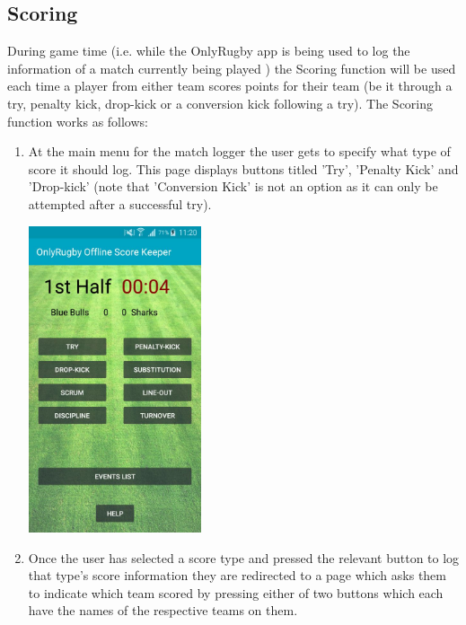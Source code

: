 \documentclass[hidelinks,a4paper,12pt]{article}
\begin{document}
\newpage

	\subsection{Scoring}
		During game time (i.e. while the OnlyRugby app is being used to log the information of a match currently being played ) the Scoring function will be used each time a player from either team scores points for their team (be it through a try, penalty kick, drop-kick or a conversion kick following a try). The Scoring function works as follows:
		\begin{enumerate}
			\item At the main menu for the match logger the user gets to specify what type of score it should log. This page displays buttons titled 'Try', 'Penalty Kick' and  'Drop-kick' (note that 'Conversion Kick' is not an option as it can only be attempted after a successful try). 
		\begin{center}
	 	 	 \includegraphics[width=0.4\textwidth] {./images/game_menu.jpg}\\[0.4cm]
		\end{center}
			\item Once the user has selected a score type and pressed the relevant  button to log that type's score information they are redirected to a page which asks them to indicate which team scored by pressing either of two buttons which each have the names of the respective teams on them.
		\begin{center}

\end{center}
\end{enumerate}
\end{document}
